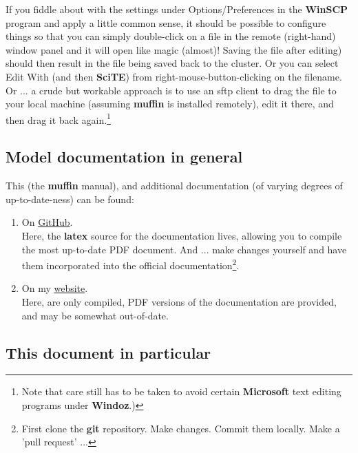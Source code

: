 \documentclass[11pt,fleqn]{book} %
\begin{document}
If you fiddle about with the settings under Options/Preferences in the \textbf{WinSCP} program and apply a little common sense, it should be possible to configure things so that you can simply double-click on a file in the remote (right-hand) window panel and it will open like magic (almost)! Saving the file after editing) should then result in the file being saved back to the cluster. Or you can select Edit With (and then \textbf{SciTE}) from right-mouse-button-clicking on the filename. Or ... a crude but workable approach is to use an sftp client to drag the file to your local machine (assuming \textbf{muffin} is installed remotely), edit it there, and then drag it back again.\footnote{Note that care still has to be taken to avoid certain \textbf{Microsoft} text editing programs under \textbf{Windoz}.)}


\subsection*{Model documentation in general}

This (the \textbf{muffin} manual), and additional documentation (of varying degrees of up-to-date-ness) can be found:

\begin{enumerate}[noitemsep]
\setlength{\itemindent}{.2in}
\item On \href{https://github.com/derpycode/muffindoc}{GitHub}.
\\Here, the \textbf{latex} source for the documentation lives, allowing you to compile the most up-to-date PDF document. And ... make changes yourself and have them incorporated into the official documentation\footnote{First clone the \textbf{git} repository. Make changes. Commit them locally. Make a 'pull request' ...}.
\item On my \href{http://www.seao2.info/mymuffin.html}{website}.
\\Here, are only compiled, PDF versions of the documentation are provided, and may be somewhat out-of-date.
\end{enumerate}


\subsection*{This document in particular}
\end{document}
